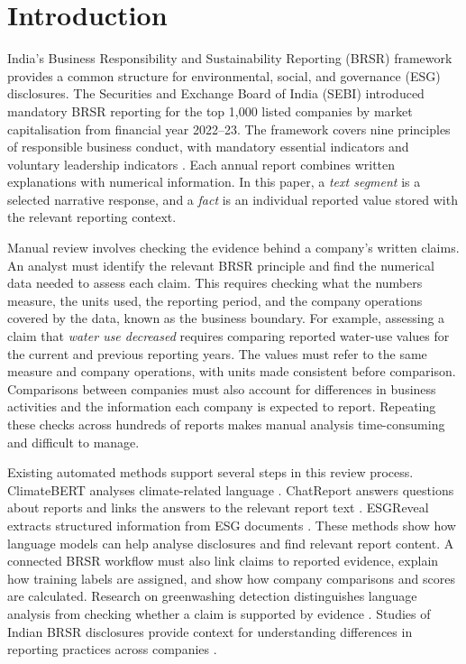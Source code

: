 \section{Introduction}
\label{sec:introduction}

India's Business Responsibility and Sustainability Reporting (BRSR) framework provides a common structure for environmental, social, and governance (ESG) disclosures. The Securities and Exchange Board of India (SEBI) introduced mandatory BRSR reporting for the top 1,000 listed companies by market capitalisation from financial year 2022--23. The framework covers nine principles of responsible business conduct, with mandatory essential indicators and voluntary leadership indicators \cite{sebi2021}. Each annual report combines written explanations with numerical information. In this paper, a \emph{text segment} is a selected narrative response, and a \emph{fact} is an individual reported value stored with the relevant reporting context.

Manual review involves checking the evidence behind a company's written claims. An analyst must identify the relevant BRSR principle and find the numerical data needed to assess each claim. This requires checking what the numbers measure, the units used, the reporting period, and the company operations covered by the data, known as the business boundary. For example, assessing a claim that \emph{water use decreased} requires comparing reported water-use values for the current and previous reporting years. The values must refer to the same measure and company operations, with units made consistent before comparison. Comparisons between companies must also account for differences in business activities and the information each company is expected to report. Repeating these checks across hundreds of reports makes manual analysis time-consuming and difficult to manage.

Existing automated methods support several steps in this review process.
ClimateBERT analyses climate-related language \cite{webersinke2021}.
ChatReport answers questions about reports and links the answers to the relevant report text \cite{ni2023}.
ESGReveal extracts structured information from ESG documents \cite{zou2025}.
These methods show how language models can help analyse disclosures and find relevant report content.
A connected BRSR workflow must also link claims to reported evidence, explain how training labels are assigned, and show how company comparisons and scores are calculated.
Research on greenwashing detection distinguishes language analysis from checking whether a claim is supported by evidence \cite{calamai2025}.
Studies of Indian BRSR disclosures provide context for understanding differences in reporting practices across companies \cite{garg2025}.

